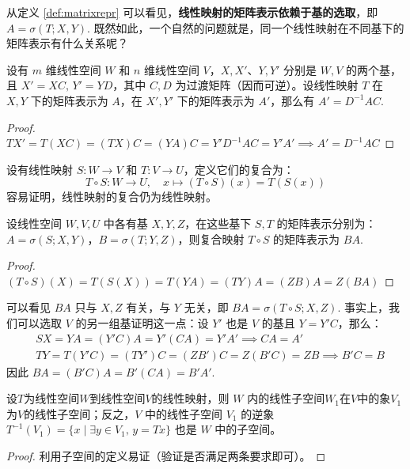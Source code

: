 从定义 \ref{def:matrixrepr} 可以看见，\textbf{线性映射的矩阵表示依赖于基的选取}，即 $A=\sigma(T;X,Y)$. 既然如此，一个自然的问题就是，同一个线性映射在不同基下的矩阵表示有什么关系呢？

\begin{theorem}[同一个线性映射在不同基下的矩阵表示的关系]
设有 $m$ 维线性空间 $W$ 和 $n$ 维线性空间 $V$，$X,X'$、$Y,Y'$ 分别是 $W,V$ 的两个基，且 $X'=XC,\,Y'=YD$，其中 $C,D$ 为过渡矩阵（因而可逆）。设线性映射 $T$ 在 $X,Y$ 下的矩阵表示为 $A$，在 $X',Y'$ 下的矩阵表示为 $A'$，那么有 $A'=D^{-1}AC$.
\end{theorem}
\begin{proof}
$TX'=T(XC)=(TX)C=(YA)C=Y'D^{-1}AC=Y'A'\implies A'=D^{-1}AC$
\end{proof}

\begin{definition}[线性映射的复合]
设有线性映射 $S:W\to V$ 和 $T: V\to U$，定义它们的复合为：
\[
    T\circ S:W\to U,\quad x\mapsto(T\circ S)(x)=T(S(x))
\]
容易证明，线性映射的复合仍为线性映射。
\end{definition}

\begin{theorem}[复合线性映射的矩阵表示]
设线性空间 $W,V,U$ 中各有基 $X,Y,Z$，在这些基下 $S,T$ 的矩阵表示分别为：$A=\sigma(S;X,Y)$，$B=\sigma(T;Y,Z)$，则复合映射 $T\circ S$ 的矩阵表示为 $BA$.
\end{theorem}
\begin{proof}
$(T\circ S)(X)=T(S(X))=T(YA)=(TY)A=(ZB)A=Z(BA)$
\end{proof}

\begin{com}
可以看见 $BA$ 只与 $X,Z$ 有关，与 $Y$ 无关，即 $BA=\sigma(T\circ S;X,Z)$. 事实上，我们可以选取 $V$ 的另一组基证明这一点：设 $Y'$ 也是 $V$ 的基且 $Y=Y'C$，那么：
\begin{align*}
    &SX=YA=(Y'C)A=Y'(CA)=Y'A'\implies CA=A'\\
    &TY=T(Y'C)=(TY')C=(ZB')C=Z(B'C)=ZB\implies B'C=B
\end{align*}
因此 $BA=(B'C)A=B'(CA)=B'A'$.
\end{com}

\begin{theorem}
设$T$为线性空间$W$到线性空间$V$的线性映射，则 $W$ 内的线性子空间$W_1$在$V$中的象$V_1$为$V$的线性子空间；反之，$V$ 中的线性子空间 $V_1$ 的逆象 $T^{-1}(V_1)=\{x\mid \exists y\in V_1,\,y=Tx\}$ 也是 $W$ 中的子空间。
\end{theorem}
\begin{proof}
利用子空间的定义易证（验证是否满足两条要求即可）。
\end{proof}

